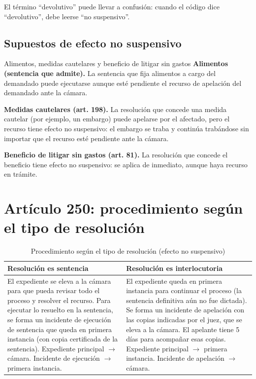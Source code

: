 \documentclass[12pt,oneside]{book}
\begin{document}
\begin{important}
El término ``devolutivo'' puede llevar a confusión: cuando el código dice ``devolutivo'', debe leerse ``no suspensivo''.
\end{important}

\subsection{Supuestos de efecto no suspensivo}

\begin{example}{Alimentos, medidas cautelares y beneficio de litigar sin gastos}
\textbf{Alimentos (sentencia que admite).} La sentencia que fija alimentos a cargo del demandado puede ejecutarse aunque esté pendiente el recurso de apelación del demandado ante la cámara.

\textbf{Medidas cautelares (art. 198).} La resolución que concede una medida cautelar (por ejemplo, un embargo) puede apelarse por el afectado, pero el recurso tiene efecto no suspensivo: el embargo se traba y continúa trabándose sin importar que el recurso esté pendiente ante la cámara.

\textbf{Beneficio de litigar sin gastos (art. 81).} La resolución que concede el beneficio tiene efecto no suspensivo: se aplica de inmediato, aunque haya recurso en trámite.
\end{example}

\section{Artículo 250: procedimiento según el tipo de resolución}

\begin{table}[H]
\centering
\caption{Procedimiento según el tipo de resolución (efecto no suspensivo)}
\begin{tabularx}{\textwidth}{X X}
\toprule
\textbf{Resolución es sentencia} & \textbf{Resolución es interlocutoria} \\
\midrule
El expediente se eleva a la cámara para que pueda revisar todo el proceso y resolver el recurso. Para ejecutar lo resuelto en la sentencia, se forma un incidente de ejecución de sentencia que queda en primera instancia (con copia certificada de la sentencia). Expediente principal $\rightarrow$ cámara. Incidente de ejecución $\rightarrow$ primera instancia. &
El expediente queda en primera instancia para continuar el proceso (la sentencia definitiva aún no fue dictada). Se forma un incidente de apelación con las copias indicadas por el juez, que se eleva a la cámara. El apelante tiene 5 días para acompañar esas copias. Expediente principal $\rightarrow$ primera instancia. Incidente de apelación $\rightarrow$ cámara. \\
\bottomrule
\end{tabularx}
\end{table}
\end{document}
